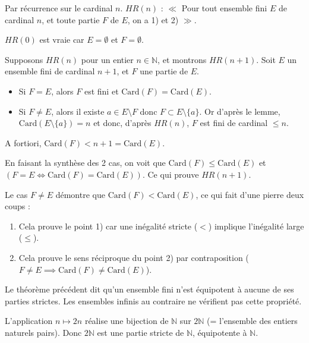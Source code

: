 \documentclass[a4paper,11pt]{article}
\newcommand{\N}{\mathbb{N}}
\begin{document}
\begin{demonstration}
Par récurrence sur le cardinal $n$.
$HR(n)$ : $\ll$ Pour tout ensemble fini $E$ de cardinal $n$, et toute partie $F$ de $E$, on a 1) et 2) $\gg$.

$HR(0)$ est vraie car $E = \emptyset$ et $F = \emptyset$.

Supposons $HR(n)$ pour un entier $n \in \N$, et montrons $HR(n+1)$.
Soit $E$ un ensemble fini de cardinal $n+1$, et $F$ une partie de $E$.
\begin{itemize}
    \item Si $F = E$, alors $F$ est fini et $\text{Card}(F) = \text{Card}(E)$.
    \item Si $F \neq E$, alors il existe $a \in E \setminus F$ donc $F \subset E \setminus \{a\}$.
    Or d'après le lemme, $\text{Card}(E \setminus \{a\}) = n$ et donc, d'après $HR(n)$, $F$ est fini de cardinal $\le n$.
\end{itemize}
A fortiori, $\text{Card}(F) < n+1 = \text{Card}(E)$.

En faisant la synthèse des 2 cas, on voit que $\text{Card}(F) \le \text{Card}(E)$ et $(F = E \iff \text{Card}(F) = \text{Card}(E))$.
Ce qui prouve $HR(n+1)$.
\end{demonstration}

\begin{remarque}
Le cas $F \neq E$ démontre que $\text{Card}(F) < \text{Card}(E)$, ce qui fait d'une pierre deux coups :
\begin{enumerate}
    \item[1)] Cela prouve le point 1) car une inégalité stricte ($<$) implique l'inégalité large ($\le$).
    \item[2)] Cela prouve le sens réciproque du point 2) par contraposition ($F \neq E \implies \text{Card}(F) \neq \text{Card}(E)$).
\end{enumerate}
\end{remarque}

\begin{remarque}
Le théorème précédent dit qu'un ensemble fini n'est équipotent à aucune de ses parties strictes. Les ensembles infinis au contraire ne vérifient pas cette propriété.
\end{remarque}

\begin{exemples}
L'application $n \mapsto 2n$ réalise une bijection de $\N$ sur $2\N$ (= l'ensemble des entiers naturels pairs).
Donc $2\N$ est une partie stricte de $\N$, équipotente à $\N$.
\end{exemples}
\end{document}
